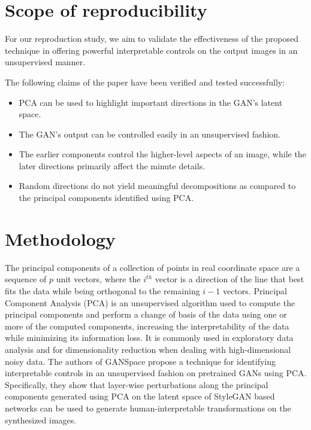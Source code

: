 \section{Scope of reproducibility}
\label{claims}


For our reproduction study, we aim to validate the effectiveness of the proposed technique in offering powerful interpretable controls on the output images in an unsupervised manner.

The following claims of the paper have been verified and tested successfully:
\begin{itemize}[noitemsep]
    \item PCA can be used to highlight important directions in the GAN's latent space.
    \item The GAN's output can be controlled easily in an unsupervised fashion.
    \item The earlier components control the higher-level aspects of an image, while the later directions primarily affect the minute details.
    \item Random directions do not yield meaningful decompositions as compared to the principal components identified using PCA.
\end{itemize}


\section{Methodology}

The principal components\cite{hotelling1933analysis} of a collection of points in real coordinate space are a sequence of $p$ unit vectors, where the $i^{th}$ vector is a direction of the line that best fits the data while being orthogonal to the remaining $i-1$ vectors. Principal Component Analysis (PCA) is an unsupervised algorithm used to compute the principal components and perform a change of basis of the data using one or more of the computed components, increasing the interpretability of the data while minimizing its information loss\cite{jolliffe2016principal}. It is commonly used in exploratory data analysis and for dimensionality reduction when dealing with high-dimensional noisy data. The authors of GANSpace propose a technique for identifying interpretable controls in an unsupervised fashion on pretrained GANs using PCA. Specifically, they show that layer-wise perturbations along the principal components generated using PCA on the latent space of StyleGAN based networks can be used to generate human-interpretable transformations on the synthesized images.

